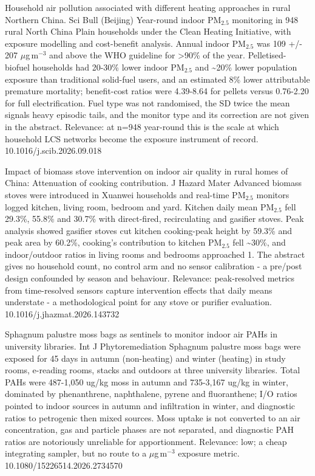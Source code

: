 \documentclass[10pt]{article}
\begin{document}

{Household air pollution associated with different heating approaches in rural Northern China.}
{Sci Bull (Beijing)}
{Year-round indoor PM$_{2.5}$ monitoring in 948 rural North China Plain households under the Clean Heating Initiative, with exposure modelling and cost-benefit analysis. Annual indoor PM$_{2.5}$ was 109 +/- 207 $\mu$g\,m$^{-3}$ and above the WHO guideline for >90\% of the year. Pelletised-biofuel households had 20-30\% lower indoor PM$_{2.5}$ and \textasciitilde{}20\% lower population exposure than traditional solid-fuel users, and an estimated 8\% lower attributable premature mortality; benefit-cost ratios were 4.39-8.64 for pellets versus 0.76-2.20 for full electrification. Fuel type was not randomised, the SD twice the mean signals heavy episodic tails, and the monitor type and its correction are not given in the abstract. Relevance: at n=948 year-round this is the scale at which household LCS networks become the exposure instrument of record.}
{10.1016/j.scib.2026.09.018}

{Impact of biomass stove intervention on indoor air quality in rural homes of China: Attenuation of cooking contribution.}
{J Hazard Mater}
{Advanced biomass stoves were introduced in Xuanwei households and real-time PM$_{2.5}$ monitors logged kitchen, living room, bedroom and yard. Kitchen daily mean PM$_{2.5}$ fell 29.3\%, 55.8\% and 30.7\% with direct-fired, recirculating and gasifier stoves. Peak analysis showed gasifier stoves cut kitchen cooking-peak height by 59.3\% and peak area by 60.2\%, cooking's contribution to kitchen PM$_{2.5}$ fell \textasciitilde{}30\%, and indoor/outdoor ratios in living rooms and bedrooms approached 1. The abstract gives no household count, no control arm and no sensor calibration - a pre/post design confounded by season and behaviour. Relevance: peak-resolved metrics from time-resolved sensors capture intervention effects that daily means understate - a methodological point for any stove or purifier evaluation.}
{10.1016/j.jhazmat.2026.143732}

{Sphagnum palustre moss bags as sentinels to monitor indoor air PAHs in university libraries.}
{Int J Phytoremediation}
{Sphagnum palustre moss bags were exposed for 45 days in autumn (non-heating) and winter (heating) in study rooms, e-reading rooms, stacks and outdoors at three university libraries. Total PAHs were 487-1,050 ug/kg moss in autumn and 735-3,167 ug/kg in winter, dominated by phenanthrene, naphthalene, pyrene and fluoranthene; I/O ratios pointed to indoor sources in autumn and infiltration in winter, and diagnostic ratios to petrogenic then mixed sources. Moss uptake is not converted to an air concentration, gas and particle phases are not separated, and diagnostic PAH ratios are notoriously unreliable for apportionment. Relevance: low; a cheap integrating sampler, but no route to a $\mu$g\,m$^{-3}$ exposure metric.}
{10.1080/15226514.2026.2734570}
\end{document}
